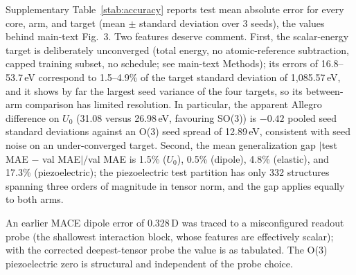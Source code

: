 Supplementary Table~\ref{stab:accuracy} reports test mean absolute error for every core, arm, and target (mean $\pm$ standard deviation over 3 seeds), the values behind main-text Fig.~3. Two features deserve comment. First, the scalar-energy target is deliberately unconverged (total energy, no atomic-reference subtraction, capped training subset, no schedule; see main-text Methods); its errors of 16.8--53.7\,eV correspond to 1.5--4.9\% of the target standard deviation of 1,085.57\,eV, and it shows by far the largest seed variance of the four targets, so its between-arm comparison has limited resolution. In particular, the apparent Allegro difference on $U_0$ (31.08 versus 26.98\,eV, favouring SO(3)) is $-0.42$ pooled seed standard deviations against an O(3) seed spread of 12.89\,eV, consistent with seed noise on an under-converged target. Second, the mean generalization gap $|$test MAE $-$ val MAE$|/$val MAE is 1.5\% ($U_0$), 0.5\% (dipole), 4.8\% (elastic), and 17.3\% (piezoelectric); the piezoelectric test partition has only 332 structures spanning three orders of magnitude in tensor norm, and the gap applies equally to both arms.

An earlier MACE dipole error of 0.328\,D was traced to a misconfigured readout probe (the shallowest interaction block, whose features are effectively scalar); with the corrected deepest-tensor probe the value is as tabulated. The O(3) piezoelectric zero is structural and independent of the probe choice.

